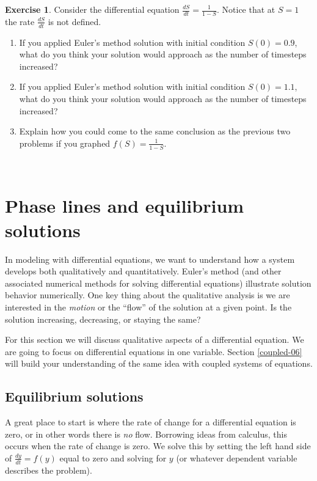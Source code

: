 \documentclass[
]{book}
\theoremstyle{definition}
\theoremstyle{definition}
\theoremstyle{definition}
\newtheorem{exercise}{Exercise}[chapter]
\theoremstyle{remark}
\begin{document}
\begin{exercise}
\protect\hypertarget{exr:unnamed-chunk-77}{}{\label{exr:unnamed-chunk-77} }Consider the differential equation \(\displaystyle \frac{dS}{dt} = \frac{1}{1-S}\). Notice that at \(S=1\) the rate \(\displaystyle \frac{dS}{dt}\) is not defined.

\begin{enumerate}[label=\alph*.]
\item If you applied Euler's method solution with initial condition $S(0)=0.9$, what do you think your solution would approach as the number of timesteps increased?
\item If you applied Euler's method solution with initial condition $S(0)=1.1$, what do you think your solution would approach as the number of timesteps increased?
\item Explain how you could come to the same conclusion as the previous two problems if you graphed $\displaystyle f(S) = \frac{1}{1-S}$.
\end{enumerate}
\end{exercise}

~

\hypertarget{phase-05}{%
\chapter{Phase lines and equilibrium solutions}\label{phase-05}}

In modeling with differential equations, we want to understand how a system develops both qualitatively and quantitatively. Euler's method (and other associated numerical methods for solving differential equations) illustrate solution behavior numerically. One key thing about the qualitative analysis is we are interested in the \emph{motion} or the ``flow'' of the solution at a given point. Is the solution increasing, decreasing, or staying the same?

For this section we will discuss qualitative aspects of a differential equation. We are going to focus on differential equations in one variable. Section \ref{coupled-06} will build your understanding of the same idea with coupled systems of equations.

\hypertarget{equilibrium-solutions}{%
\section{Equilibrium solutions}\label{equilibrium-solutions}}

A great place to start is where the rate of change for a differential equation is zero, or in other words there is \emph{no} flow. Borrowing ideas from calculus, this occurs when the rate of change is zero. We solve this by setting the left hand side of \(\displaystyle \frac{dy}{dt}=f(y)\) equal to zero and solving for \(y\) (or whatever dependent variable describes the problem).
\end{document}
